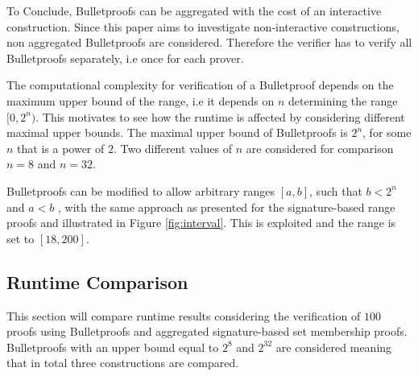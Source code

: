 To Conclude, Bulletproofs can be aggregated with the cost of an interactive construction. Since this paper aims to investigate non-interactive constructions,  non aggregated Bulletproofs are considered. Therefore the verifier has to verify all Bulletproofs separately, i.e once for each prover. 

The computational complexity for verification of a Bulletproof depends on the maximum upper bound of the range, i.e it depends on $n$ determining the range $[0,2^n)$. This motivates to see how the runtime is affected by considering different maximal upper bounds.  The maximal upper bound of Bulletproofs is $2^n$, for some $n$ that is a power of $2$. Two different values of $n$ are considered for comparison $n=8 $ and $n=32$. 

Bulletproofs can be modified to allow arbitrary ranges $[a,b]$, such that $b<2^n$ and $a<b$ , with the same approach as presented for the signature-based range proofs and illustrated in Figure \ref{fig:interval}. This is exploited and the range is set to $[18,200]$. 

 



\subsection*{Runtime Comparison}
This section will compare runtime results considering the verification of $100$ proofs using Bulletproofs and aggregated signature-based set membership proofs.  Bulletproofs with an upper bound equal to $2^8$ and $2^{32}$ are considered meaning that in total three constructions are compared.


